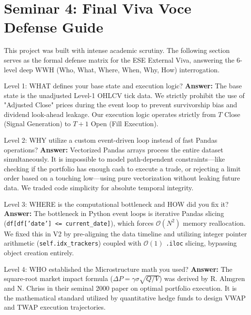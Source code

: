 \documentclass[12pt,a4paper,oneside]{report}
\begin{document}
\chapter{Seminar 4: Final Viva Voce Defense Guide}

This project was built with intense academic scrutiny. The following section serves as the formal defense matrix for the ESE External Viva, answering the 6-level deep WWH (Who, What, Where, When, Why, How) interrogation.

\begin{defensebox}{Level 1: WHAT defines your base state and execution logic?}
\textbf{Answer:} The base state is the unadjusted Level-1 OHLCV tick data. We strictly prohibit the use of "Adjusted Close" prices during the event loop to prevent survivorship bias and dividend look-ahead leakage. Our execution logic operates strictly from $T$ Close (Signal Generation) to $T+1$ Open (Fill Execution).
\end{defensebox}

\begin{defensebox}{Level 2: WHY utilize a custom event-driven loop instead of fast Pandas operations?}
\textbf{Answer:} Vectorized Pandas arrays process the entire dataset simultaneously. It is impossible to model path-dependent constraints—like checking if the portfolio has enough cash to execute a trade, or rejecting a limit order based on a touching low—using pure vectorization without leaking future data. We traded code simplicity for absolute temporal integrity.
\end{defensebox}

\begin{defensebox}{Level 3: WHERE is the computational bottleneck and HOW did you fix it?}
\textbf{Answer:} The bottleneck in Python event loops is iterative Pandas slicing (\texttt{df[df['date'] <= current\_date]}), which forces $\mathcal{O}(N^2)$ memory reallocation. We fixed this in V2 by pre-aligning the data timeline and utilizing integer pointer arithmetic (\texttt{self.idx\_trackers}) coupled with $\mathcal{O}(1)$ \texttt{.iloc} slicing, bypassing object creation entirely.
\end{defensebox}

\begin{defensebox}{Level 4: WHO established the Microstructure math you used?}
\textbf{Answer:} The square-root market impact formula ($\Delta P = \gamma \sigma \sqrt{Q/V}$) was derived by R. Almgren and N. Chriss in their seminal 2000 paper on optimal portfolio execution. It is the mathematical standard utilized by quantitative hedge funds to design VWAP and TWAP execution trajectories.
\end{defensebox}
\end{document}

